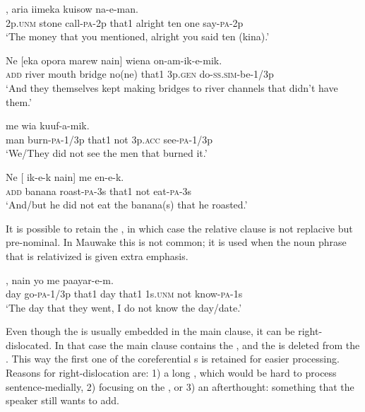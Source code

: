 \ea%
\label{ex:x1529}
,  aria  iimeka  kuisow  na-e-man. \\
2p.\textsc{unm} stone call-\textsc{pa}-2p that1 alright ten one say-\textsc{pa}-2p      \\
\glt`The money that you mentioned, alright you said ten (kina).'
\z


\ea%
\label{ex:x1530}
\gll Ne  [eka  opora    marew  nain]  wiena on-am-ik-e-mik. \\
\textsc{add} river  mouth  bridge  no(ne)  that1  3p.\textsc{gen} do-\textsc{ss}.\textsc{sim}-be-1/3p\\
\glt`And they themselves kept making bridges to river channels that didn't have them.' 
\z


\ea%
\label{ex:x1545}
  me  wia  kuuf-a-mik. \\
man  burn-\textsc{pa}-1/3p  that1  not  3p.\textsc{acc} see-\textsc{pa}-1/3p\\
\glt`We/They did not see the men that burned it.'
\z


\ea%
\label{ex:x1546}
\gll Ne  [  ik-e-k  nain]  me  en-e-k. \\
\textsc{add} banana  roast-\textsc{pa}-3s  that1  not  eat-\textsc{pa}-3s\\
\glt`And/but he did not eat the banana(s) that he roasted.'
\z


It is possible to retain the , in which case the relative clause is not replacive but pre-nominal. In Mauwake this is not common; it is used when the noun phrase that is relativized is given extra emphasis. 

\ea%
\label{ex:x1532}
,    nain  yo  me  paayar-e-m. \\
day  go-\textsc{pa}-1/3p  that1  day  that1  1s.\textsc{unm} not  know-\textsc{pa}-1s\\
\glt`The day that they went, I do not know the day/date.'
\z


Even though the  is usually embedded in the main clause, it can be right-dislocated. In that case the main clause contains the , and the  is deleted from the . This way the first one of the coreferential s is retained for easier processing. Reasons for right-dislocation are: 1) a long , which would be hard to process sentence-medially, 2) focusing on the , or 3) an afterthought: something that the speaker still wants to add.

